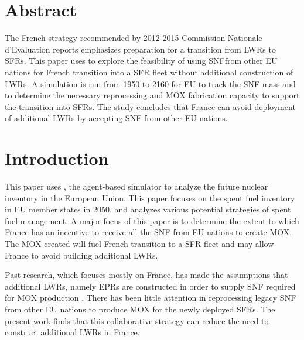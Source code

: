 \section{Abstract}
The French strategy recommended by 2012-2015 Commission Nationale d'Evaluation reports
\cite{cne2_noauthor_2015} emphasizes preparation for a transition from \glspl{LWR} to \glspl{SFR}.
This paper uses \Cyclus to explore the feasibility of using \gls{SNF}from other EU nations
for French transition into a \gls{SFR} fleet without additional construction of \glspl{LWR}.
A \Cyclus simulation is run from 1950 to 2160 for EU to track the \gls{SNF} mass
and to determine the necessary reprocessing and \gls{MOX} fabrication capacity to support
the transition into \glspl{SFR}. The study concludes that France can avoid deployment
of additional \glspl{LWR} by accepting \gls{SNF} from other EU nations.


\section{Introduction}
This paper uses \Cyclus, the agent-based simulator \cite{huff_fundamental_2016} to analyze
the future nuclear inventory in the European Union. This paper focuses on the spent fuel
inventory in \gls{EU} member states in 2050, and analyzes various potential strategies of spent fuel
management.
A major focus of this paper is to determine the extent to which France has an incentive
to receive all the \gls{SNF} from \gls{EU} nations to create \gls{MOX}.
The \gls{MOX} created will fuel French transition to a \gls{SFR} fleet
and may allow France to avoid building additional \glspl{LWR}.

Past research, which focuses mostly on France, has made the assumptions that additional \glspl{LWR},
namely \glspl{EPR} are constructed in order to supply \gls{SNF} required
for \gls{MOX} production \cite{carre_overview_2009, martin_symbiotic_2007, freynet_multiobjective_2016}.
There has been little attention in reprocessing legacy \gls{SNF} from other
EU nations to produce \gls{MOX} for the newly deployed \glspl{SFR}.
The present work finds that this collaborative strategy can reduce the
need to construct additional \glspl{LWR} in France.

